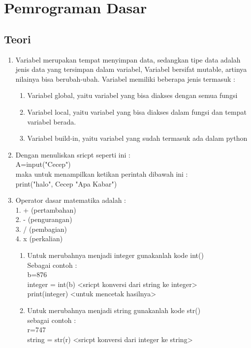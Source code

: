 \chapter{Pemrograman Dasar}
\section{Teori}
\begin{enumerate}
\item
Variabel merupakan tempat menyimpan data, sedangkan tipe data adalah jenis data yang tersimpan dalam variabel, Variabel bersifat mutable, artinya nilainya bisa berubah-ubah. Variabel memiliki beberapa jenis termasuk : 
	\begin{enumerate}
	\item
	Variabel global, yaitu variabel yang bisa diakses dengan semua fungsi
	\item
	Variabel local, yaitu variabel yang bisa diakses dalam fungsi dan tempat variabel berada.
	\item
	Variabel build-in, yaitu variabel yang sudah termasuk ada dalam python
	\end{enumerate}
\item
Dengan menuliskan sricpt seperti ini : \\
A=input("Cecep") \\
maka untuk menampilkan ketikan perintah dibawah ini : \\
print("halo", Cecep "Apa Kabar")
\item
Operator dasar matematika adalah : \\
	1. + (pertambahan)\\
	2. - (pengurangan)\\
	3. / (pembagian)\\
	4. x (perkalian)\\
\begin{enumerate}
\item
Untuk merubahnya menjadi integer gunakanlah kode int() \\ 
Sebagai contoh : \\
b=876 \\ integer = int(b) <sricpt konversi dari string ke integer> \\
print(integer) <untuk mencetak hasilnya> \\
\item
Untuk merubahnya menjadi string gunakanlah kode str() \\
sebagai contoh : \\
r=747 \\ string = str(r) <sricpt konversi dari integer ke string> \\

\end{enumerate}
\end{enumerate}
